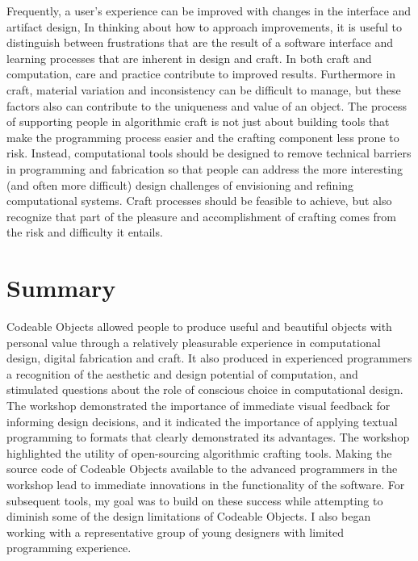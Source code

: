Frequently, a user's experience can be improved with changes in the interface and artifact design, In thinking about how to approach improvements, it is useful to distinguish between frustrations that are the result of a software interface and learning processes that are inherent in design and craft. In both craft and computation, care and practice contribute to improved results. Furthermore in craft, material variation and inconsistency can be difficult to manage, but these factors also can contribute to the uniqueness and value of an object. The process of supporting people in algorithmic craft is not just about building tools that make the programming process easier and the crafting component less prone to risk. Instead, computational tools should be designed to remove technical barriers in programming and fabrication so that people can address the more interesting (and often more difficult) design challenges of envisioning and refining computational systems. Craft processes should be feasible to achieve, but also recognize that part of the pleasure and accomplishment of crafting comes from the risk and difficulty it entails. 

\section{Summary}
Codeable Objects allowed people to produce useful and beautiful objects with personal value through a relatively pleasurable experience in computational design, digital fabrication and craft. It also produced in experienced programmers a recognition of the aesthetic and design potential of computation, and stimulated questions about the role of conscious choice in computational design. The workshop demonstrated the importance of immediate visual feedback for informing design decisions, and it indicated the importance of applying textual programming to formats that clearly demonstrated its advantages. The workshop highlighted the utility of open-sourcing algorithmic crafting tools. Making the source code of Codeable Objects available to the advanced programmers in the workshop lead to immediate innovations in the functionality of the software. For subsequent tools, my goal was to build on these success while attempting to diminish some of the design limitations of Codeable Objects. I also began working with a representative group of young designers with limited programming experience. 